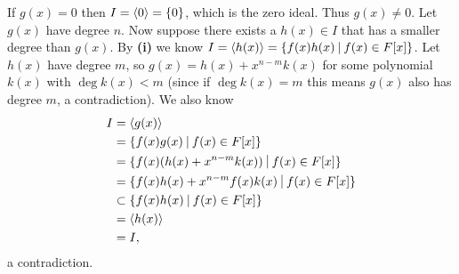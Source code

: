 \begin{questions}
\begin{partquestions}{\roman*}
        \item If $g(x) = 0$ then $I = \left\langle0\right\rangle = \{0\}$, which is the zero ideal. Thus $g(x) \neq 0$. Let $g(x)$ have degree $n$. Now suppose there exists a $h(x) \in I$ that has a smaller degree than $g(x)$. By \textbf{(i)} we know $I = \princ{h(x)} = \{f(x)h(x) \vert f(x) \in F[x]\}$. Let $h(x)$ have degree $m$, so $g(x) = h(x) + x^{n-m}k(x)$ for some polynomial $k(x)$ with $\deg k(x) < m$ (since if $\deg k(x) = m$ this means $g(x)$ also has degree $m$, a contradiction). We also know
        \begin{align*}
            I &= \princ{g(x)}\\
            &= \{f(x)g(x) \vert f(x) \in F[x]\}\\
            &= \{f(x)(h(x) + x^{n-m}k(x)) \vert f(x) \in F[x]\}\\
            &= \{f(x)h(x) + x^{n-m}f(x)k(x) \vert f(x) \in F[x]\}\\
            &\subset \{f(x)h(x) \vert f(x) \in F[x]\}\\
            &= \princ{h(x)}\\
            &= I,
        \end{align*}
        a contradiction.
    \end{partquestions}


\end{questions}
